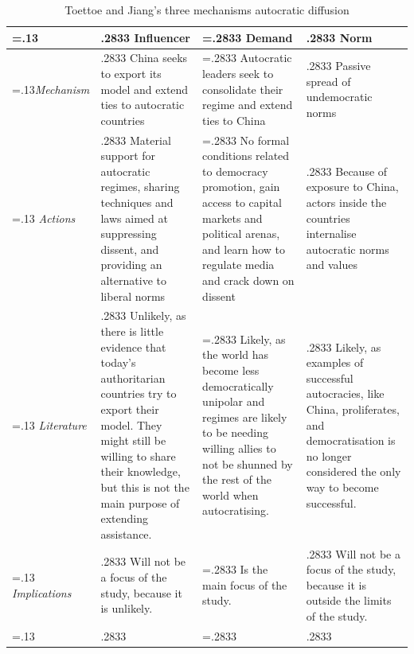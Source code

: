 \begin{table}[!hbt]
\centering
\caption{\label{tab:mechanism}Toettoe and Jiang's three mechanisms autocratic diffusion}
\vspace{0.5em}
\begin{tabularx}{1\textwidth} {
 >{\noindent\justifying\arraybackslash\hsize=.13\hsize}X 
 >{\noindent\justifying\arraybackslash\hsize.2833\hsize}X 
 >{\noindent\justifying\arraybackslash\hsize=.2833\hsize}X 
 >{\noindent\justifying\arraybackslash\hsize.2833\hsize}X}
\toprule
& \textbf{Influencer} 
& \textbf{Demand}
& \textbf{Norm} \\
\midrule
\textit{Mechanism}
& China seeks to export its model and extend ties to autocratic countries 
& Autocratic leaders seek to consolidate their regime and extend ties to China 
& Passive spread of undemocratic norms \\
\addlinespace
\textit{Actions} 
& Material support for autocratic regimes, sharing techniques and laws aimed at suppressing dissent, and providing an alternative to liberal norms 
& No formal conditions related to democracy promotion, gain access to capital markets and political arenas, and learn how to regulate media and crack down on dissent 
& Because of exposure to China, actors inside the countries internalise autocratic norms and values \\
\addlinespace
\textit{Literature }
& Unlikely, as there is little evidence that today's authoritarian countries try to export their model. They might still be willing to share their knowledge, but this is not the main purpose of extending assistance.
& Likely, as the world has become less democratically unipolar and regimes are likely to be needing willing allies to not be shunned by the rest of the world when autocratising.
& Likely, as examples of successful autocracies, like China, proliferates, and democratisation is no longer considered the only way to become successful.\\
\addlinespace
\textit{Implications}
& Will not be a focus of the study, because it is unlikely.
& Is the main focus of the study.
& Will not be a focus of the study, because it is outside the limits of the study. \\
\bottomrule

 \multicolumn{4}{p{\textwidth}}{\raggedright{\textit{Mechanisms are found in \citet[pp. 29-31]{toettoe_foreign_2023}}}}

\end{tabularx}
\end{table}

